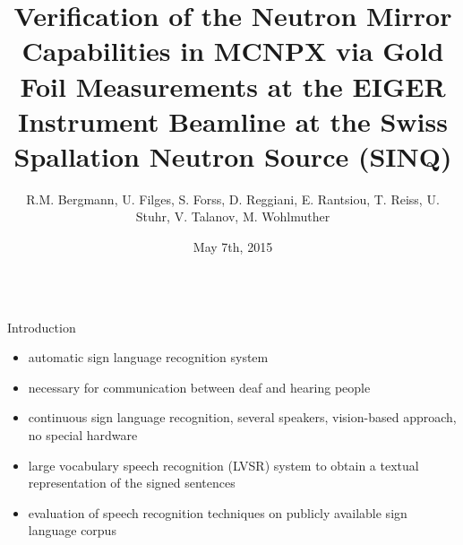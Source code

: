 \documentclass[final,t]{beamer}
\title{\huge Verification of the Neutron Mirror Capabilities in MCNPX via Gold Foil Measurements at the EIGER Instrument Beamline at the Swiss Spallation Neutron Source (SINQ) } %
\author{R.M. Bergmann, U. Filges, S. Forss, D. Reggiani, E. Rantsiou, T. Reiss, U. Stuhr, V. Talanov, M. Wohlmuther} %
\institute[PSI]{Paul Scherrer Institut, Villigen, Switzerland}
\date[May 7th, 2015]{May 7th, 2015}
\begin{document}
\begin{frame}{} 
  \begin{columns}[t]
    \begin{column}{.3\linewidth}


      \begin{block}{Introduction}
        \begin{itemize}
        \item automatic sign language recognition system                                    %
        \item \alert{necessary for communication} between deaf and
          hearing people
        \item \alert{continuous} sign language recognition,
          \alert{several} speakers, \alert{vision-based} approach, \alert{no
            special hardware}
        \item large vocabulary speech recognition (LVSR) system to
          obtain a textual representation of the signed
          sentences 
        \item evaluation of speech recognition techniques on \alert{publicly
          available sign language
          corpus}
        \end{itemize}
      \end{block}

      

\end{column}
\end{columns}
\end{frame}
\end{document}
